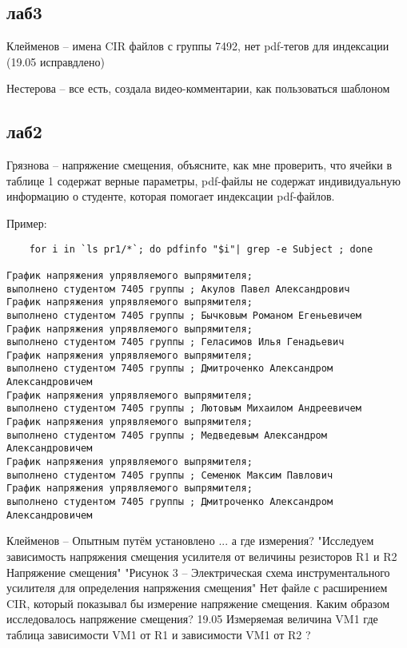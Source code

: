 \documentclass[a4paper,11pt]{article}
\begin{document}
\subsection*{лаб3}

Клейменов -- имена CIR файлов с группы 7492, нет pdf-тегов для индексации (19.05 исправдлено)

Нестерова -- все есть, создала видео-комментарии, как пользоваться шаблоном

\newpage
\subsection*{лаб2}
Грязнова -- напряжение смещения, объясните, как мне проверить, что ячейки в таблице 1 содержат верные параметры,
            pdf-файлы не содержат индивидуальную информацию о студенте, которая помогает индексации pdf-файлов.

Пример:
\begin{verbatim}
    for i in `ls pr1/*`; do pdfinfo "$i"| grep -e Subject ; done

График напряжения упрявляемого выпрямителя; 
выполнено студентом 7405 группы ; Акулов Павел Александрович
График напряжения упрявляемого выпрямителя; 
выполнено студентом 7405 группы ; Бычковым Романом Егеньевичем
График напряжения упрявляемого выпрямителя; 
выполнено студентом 7405 группы ; Геласимов Илья Генадьевич
График напряжения упрявляемого выпрямителя; 
выполнено студентом 7405 группы ; Дмитроченко Александром Александровичем
График напряжения упрявляемого выпрямителя; 
выполнено студентом 7405 группы ; Лютовым Михаилом Андреевичем
График напряжения упрявляемого выпрямителя; 
выполнено студентом 7405 группы ; Медведевым Александром Александровичем
График напряжения упрявляемого выпрямителя; 
выполнено студентом 7405 группы ; Семенюк Максим Павлович
График напряжения упрявляемого выпрямителя; 
выполнено студентом 7405 группы ; Дмитроченко Александром Александровичем
\end{verbatim}



Клейменов -- Опытным путём установлено ... а где измерения? 
 "Исследуем зависимость напряжения смещения усилителя от величины резисторов R1 и R2 Напряжение смещения"
"Рисунок 3 – Электрическая схема инструментального усилителя для определения напряжения смещения"
Нет файле с расширением CIR, который показывал бы измерение напряжение смещения.
Каким образом исследовалось напряжение смещения?
19.05 Измеряемая величина VM1 где таблица зависимости VM1 от R1 и зависимости VM1 от R2 ?
\end{document}
